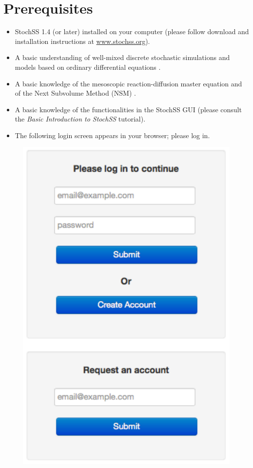 \section{Prerequisites}

\begin{itemize}
\item StochSS 1.4 (or later) installed on your computer (please follow download and installation instructions at \url{www.stochss.org}). 
\item A basic understanding of well-mixed discrete stochastic simulations and models based on ordinary differential equations \cite{dan,sundials}.
\item A basic knowledge of the mesoscopic reaction-diffusion master equation and of the Next Subvolume Method (NSM) \cite{nsm}.
\item  A basic knowledge of the functionalities in the StochSS GUI (please consult the \textit{Basic Introduction to StochSS} tutorial).
\item The following login screen appears in your browser; please log in.
\end{itemize}

\begin{figure}[!ht]
\centering
\includegraphics[scale=0.55]{T6/user-login.pdf}
\end{figure}